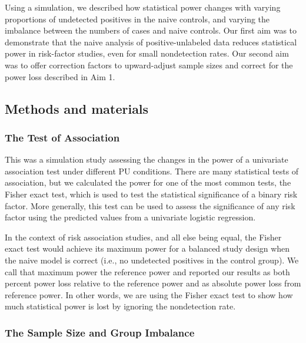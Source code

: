\documentclass[
]{article}
\begin{document}
Using a simulation, we described how statistical power changes with
varying proportions of undetected positives in the naive controls, and
varying the imbalance between the numbers of cases and naive controls.
Our first aim was to demonstrate that the naive analysis of
positive-unlabeled data reduces statistical power in risk-factor
studies, even for small nondetection rates. Our second aim was to offer
correction factors to upward-adjust sample sizes and correct for the
power loss described in Aim 1.

\newpage

\hypertarget{methods-and-materials}{%
\subsection{Methods and materials}\label{methods-and-materials}}

\hypertarget{the-test-of-association}{%
\subsubsection{The Test of Association}\label{the-test-of-association}}

This was a simulation study assessing the changes in the power of a
univariate association test under different PU conditions. There are
many statistical tests of association, but we calculated the power for
one of the most common tests, the Fisher exact test, which is used to
test the statistical significance of a binary risk factor. More
generally, this test can be used to assess the significance of any risk
factor using the predicted values from a univariate logistic regression.

In the context of risk association studies, and all else being equal,
the Fisher exact test would achieve its maximum power for a balanced
study design when the naive model is correct (i.e., no undetected
positives in the control group). We call that maximum power the
reference power and reported our results as both percent power loss
relative to the reference power and as absolute power loss from
reference power. In other words, we are using the Fisher exact test to
show how much statistical power is lost by ignoring the nondetection
rate.

\hypertarget{the-sample-size-and-group-imbalance}{%
\subsubsection{The Sample Size and Group
Imbalance}\label{the-sample-size-and-group-imbalance}}
\end{document}
